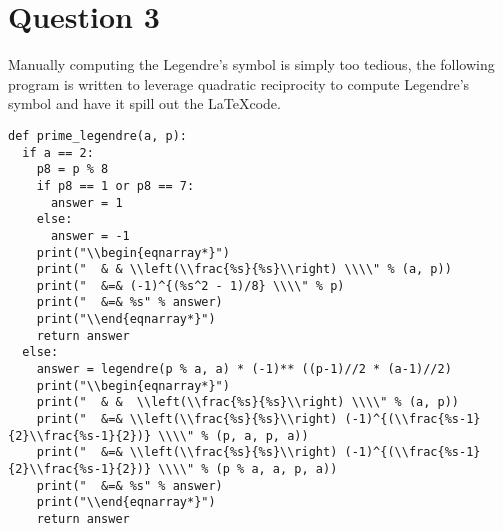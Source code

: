 \documentclass{article}
\begin{document}
\section*{Question 3}
Manually computing the Legendre's symbol is simply too tedious, the following program is written to leverage quadratic reciprocity to compute Legendre's symbol and have it spill out the \LaTeX code.
\begin{verbatim}
def prime_legendre(a, p):
  if a == 2:
    p8 = p % 8
    if p8 == 1 or p8 == 7:
      answer = 1
    else:
      answer = -1
    print("\\begin{eqnarray*}")
    print("  & & \\left(\\frac{%s}{%s}\\right) \\\\" % (a, p))
    print("  &=& (-1)^{(%s^2 - 1)/8} \\\\" % p)
    print("  &=& %s" % answer)
    print("\\end{eqnarray*}")
    return answer
  else:
    answer = legendre(p % a, a) * (-1)** ((p-1)//2 * (a-1)//2)
    print("\\begin{eqnarray*}")
    print("  & &  \\left(\\frac{%s}{%s}\\right) \\\\" % (a, p))
    print("  &=& \\left(\\frac{%s}{%s}\\right) (-1)^{(\\frac{%s-1}{2}\\frac{%s-1}{2})} \\\\" % (p, a, p, a))
    print("  &=& \\left(\\frac{%s}{%s}\\right) (-1)^{(\\frac{%s-1}{2}\\frac{%s-1}{2})} \\\\" % (p % a, a, p, a))
    print("  &=& %s" % answer)
    print("\\end{eqnarray*}")
    return answer


\end{verbatim}
\end{document}
